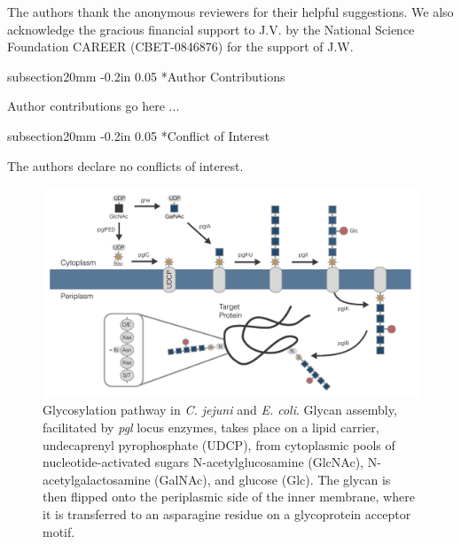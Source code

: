 \documentclass[12pt]{article}
\makeatletter
\renewcommand\section{\@startsection
	{subsection}{2}{0mm}
	{-0.2in}
	{0.05\baselineskip}
	{\normalfont\large\bfseries}}
\makeatother
\begin{document}
The authors thank the anonymous reviewers for their helpful suggestions. 
We also acknowledge the gracious financial support to J.V. by the National Science Foundation CAREER (CBET-0846876) for the support of J.W.

\section*{Author Contributions}

Author contributions go here ...

\section*{Conflict of Interest}

The authors declare no conflicts of interest. 

\newpage





\clearpage

\begin{figure}
\centering
\includegraphics[width=\textwidth]{./figures/fig1-glyco-Ecoli.pdf}
\caption{Glycosylation pathway in \textit{C. jejuni} and \textit{E. coli}. Glycan assembly, facilitated by \textit{pgl} locus enzymes, takes place on a lipid carrier, undecaprenyl pyrophosphate (UDCP), from cytoplasmic pools of nucleotide-activated sugars N-acetylglucosamine (GlcNAc), N-acetylgalactosamine (GalNAc), and glucose (Glc). The glycan is then flipped onto the periplasmic side of the inner membrane, where it is transferred to an asparagine residue on a glycoprotein acceptor motif.}
\label{fig-glyco-Ecoli}
\end{figure}
\end{document}
